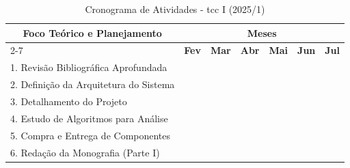 \documentclass[a4paper, 12pt]{article}
\begin{document}
\begin{table}[!ht]
\centering
\caption{Cronograma de Atividades - \acrshort{tcc} I (2025/1)}
\label{tab:cronograma_tcc1}
\begin{tabular}{|l|c|c|c|c|c|c|}
\hline
\multicolumn{1}{|c|}{\multirow{2}{*}{\textbf{Foco Teórico e Planejamento}}} & \multicolumn{6}{c|}{\textbf{Meses}} \\ \cline{2-7} 
\multicolumn{1}{|c|}{} & \textbf{Fev} & \textbf{Mar} & \textbf{Abr} & \textbf{Mai} & \textbf{Jun} & \textbf{Jul} \\ \hline
1. Revisão Bibliográfica Aprofundada & \cellcolor[HTML]{C0C0C0} & \cellcolor[HTML]{C0C0C0} & \cellcolor[HTML]{C0C0C0} & & & \\ \hline
2. Definição da Arquitetura do Sistema & & & \cellcolor[HTML]{C0C0C0} & \cellcolor[HTML]{C0C0C0} & & \\ \hline
3. Detalhamento do Projeto & & & \cellcolor[HTML]{C0C0C0} & \cellcolor[HTML]{C0C0C0} & \cellcolor[HTML]{C0C0C0} & \\ \hline
4. Estudo de Algoritmos para Análise & & & & & \cellcolor[HTML]{C0C0C0} & \cellcolor[HTML]{C0C0C0}\\ \hline
5. Compra e Entrega de Componentes & & & & &  & \cellcolor[HTML]{C0C0C0} \\ \hline
6. Redação da Monografia (Parte I) & \cellcolor[HTML]{C0C0C0} & \cellcolor[HTML]{C0C0C0} & \cellcolor[HTML]{C0C0C0} & \cellcolor[HTML]{C0C0C0} & \cellcolor[HTML]{C0C0C0} & \cellcolor[HTML]{C0C0C0} \\ \hline
\end{tabular}
\end{table}
\end{document}
